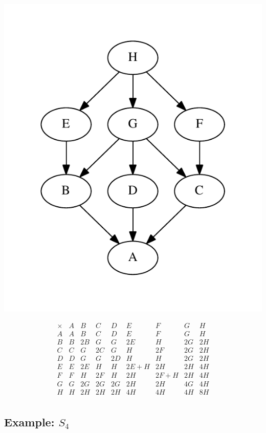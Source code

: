 \documentclass[11pt,oneside]{article}
\newcommand{\thinplus}{\!+\!}
\begin{document}
\begin{center}
\includegraphics[width=0.4\columnwidth]{subgroups_d8.pdf} 
\end{center}



$$
\begin{array}{r|rrrrrrrr}
\times & A & B & C & D & E & F & G & H \\
\hline
A & A & B & C & D & E & F & G & H \\
B & B & 2B & G & G & 2E & H & 2G & 2H \\
C & C & G & 2C & G & H & 2F & 2G & 2H \\
D & D & G & G & 2D & H & H & 2G & 2H \\
E & E & 2E & H & H & 2E\thinplus H & 2H & 2H & 4H \\
F & F & H & 2F & H & 2H & 2F\thinplus H & 2H & 4H \\
G & G & 2G & 2G & 2G & 2H & 2H & 4G & 4H \\
H & H & 2H & 2H & 2H & 4H & 4H & 4H & 8H \\
\end{array}
$$


\subsection{Example: $S_4$}

\end{document}
